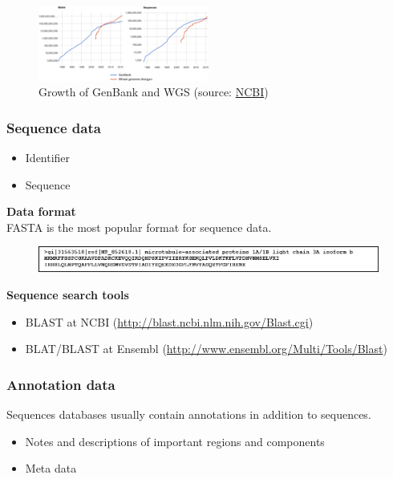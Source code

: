 \begin{figure}[H]
  \centering
      \includegraphics[width=0.5\textwidth]{fig05/genebank_stat.png}
  \caption{Growth of GenBank and WGS (source: \href{http://www.ncbi.nlm.nih.gov/genbank/statistics}{NCBI})}
\end{figure}

%
%
\subsubsection*{Sequence data } 
\begin{itemize}
\item Identifier
\item Sequence
\end{itemize}

\noindent
\textbf{Data format} \\
FASTA is the most popular format for sequence data.
\begin{figure}[H]
  \centering
      \includegraphics[width=\textwidth]{fig05/fasta.png}
\end{figure}

\noindent
\textbf{Sequence search tools}
\begin{itemize}
\item BLAST at NCBI (\href{http://blast.ncbi.nlm.nih.gov/Blast.cgi}{http://blast.ncbi.nlm.nih.gov/Blast.cgi})
\item BLAT/BLAST at Ensembl (\href{http://www.ensembl.org/Multi/Tools/Blast}{http://www.ensembl.org/Multi/Tools/Blast})
\end{itemize}

%
%
\subsubsection*{Annotation data} 
Sequences databases usually contain annotations in addition to sequences. 

\begin{itemize}
\item Notes and descriptions of important regions and components
\item Meta data
\end{itemize}

